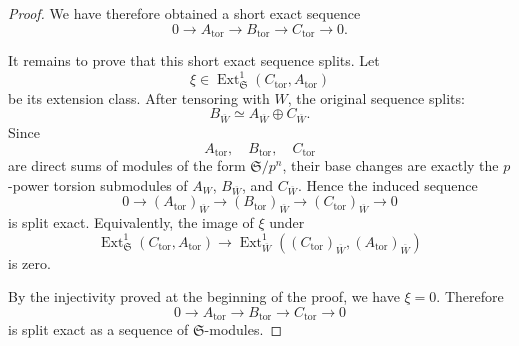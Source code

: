 \documentclass[10pt,a4paper]{amsart}
\newcommand{\Ext}{\operatorname{Ext}}
\newcommand{\mS}{\mf{S}}
\newcommand{\mf}{\mathfrak}
\newcommand{\ol}{\overline}
\newcommand{\tors}{\operatorname{tor}}
\begin{document}
\begin{proof}
We have therefore obtained a short exact sequence
\[
  0\to A_{\tors}
  \longrightarrow
  B_{\tors}
  \longrightarrow
  C_{\tors}
  \to 0.
\]

It remains to prove that this short exact sequence splits.  Let
\[
  \xi\in \Ext^1_{\mS}(C_{\tors},A_{\tors})
\]
be its extension class.  After tensoring with $W$, the original sequence
splits:
\[
  B_{\ol{W}}\simeq A_{\ol{W}}\oplus C_{\ol{W}}.
\]
Since
\[
  A_{\tors},\quad B_{\tors},\quad C_{\tors}
\]
are direct sums of modules of the form $\mS/p^n$, their base changes are
exactly the $p$-power torsion submodules of $A_W$, $B_{\ol{W}}$, and $C_{\ol{W}}$.
Hence the induced sequence
\[
  0\to (A_{\tors})_{\ol{W}}
  \longrightarrow
  (B_{\tors})_{\ol{W}}
  \longrightarrow
  (C_{\tors})_{\ol{W}}
  \to 0
\]
is split exact.  Equivalently, the image of $\xi$ under
\[
  \Ext^1_{\mS}(C_{\tors},A_{\tors})
  \longrightarrow
  \Ext^1_{\ol{W}}((C_{\tors})_{\ol{W}},(A_{\tors})_{\ol{W}})
\]
is zero.

By the injectivity proved at the beginning of the proof, we have $\xi=0$.
Therefore
\[
  0\to A_{\tors}
  \longrightarrow
  B_{\tors}
  \longrightarrow
  C_{\tors}
  \to 0
\]
is split exact as a sequence of $\mS$-modules.
\end{proof}
\end{document}
